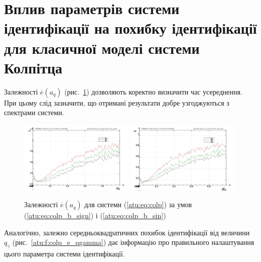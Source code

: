 
\section{Вплив параметрів системи ідентифікації на похибку ідентифікації для класичної моделі системи Колпітца} %

Залежності
$ \overline{e} (a_q) $ (рис.~\ref{atu:f:colp_e_a_q}) дозволяють коректно визначити час
усереднення. При цьому слід зазначити, що отримані результати
добре узгоджуються з спектрами системи.

\begin{figure}[htb!]
\centerline{
  \includegraphics[width=0.49\textwidth]{p/mod/colp_m5p-p_a_q_e_sign.png}
  \includegraphics[width=0.49\textwidth]{p/mod/colp_m5p-p_a_q_e_sin.png}
}
  \caption{Залежності  $\overline{e}(a_q)$ для системи (\ref{atu:eq:colp})
  за умов (\ref{atu:eq:colp_b_sign}) і (\ref{atu:eq:colp_b_sin})
}
\label{atu:f:colp_e_a_q}
\end{figure}

Аналогічно, залежно середньоквадратичних похибок ідентифікації
від величини
$ q_\gamma $ (рис.~\ref{atu:f:colp_e_qgamma}) дає інформацію про правильного
налаштування цього параметра системи ідентифікації.

